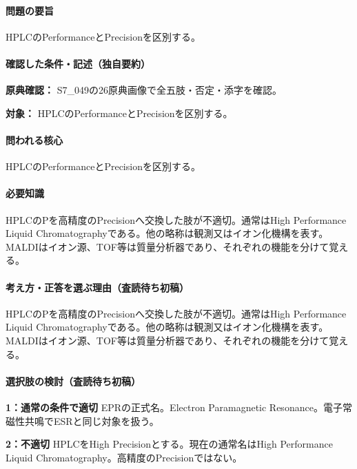\paragraph{問題の要旨} HPLCのPerformanceとPrecisionを区別する。

\paragraph{確認した条件・記述（独自要約）}\mbox{}\par

\noindent\textbf{原典確認：} S7\_049の26原典画像で全五肢・否定・添字を確認。\par

\noindent\textbf{対象：} HPLCのPerformanceとPrecisionを区別する。\par

\paragraph{問われる核心} HPLCのPerformanceとPrecisionを区別する。

\paragraph{必要知識} HPLCのPを高精度のPrecisionへ交換した肢が不適切。通常はHigh Performance Liquid Chromatographyである。他の略称は観測又はイオン化機構を表す。MALDIはイオン源、TOF等は質量分析器であり、それぞれの機能を分けて覚える。

\paragraph{考え方・正答を選ぶ理由（査読待ち初稿）} HPLCのPを高精度のPrecisionへ交換した肢が不適切。通常はHigh Performance Liquid Chromatographyである。他の略称は観測又はイオン化機構を表す。MALDIはイオン源、TOF等は質量分析器であり、それぞれの機能を分けて覚える。

\paragraph{選択肢の検討（査読待ち初稿）}\mbox{}\par

\noindent\textbf{1：通常の条件で適切} EPRの正式名。Electron Paramagnetic Resonance。電子常磁性共鳴でESRと同じ対象を扱う。\par

\noindent\textbf{2：不適切} HPLCをHigh Precisionとする。現在の通常名はHigh Performance Liquid Chromatography。高精度のPrecisionではない。\par

